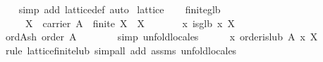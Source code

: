 \begin{isabellebody}
\ \ %
\endisadelimproof
%
\isatagproof
{}\isamarkupfalse%
\ {}simp\ add{}\ lattice{}def{}\ auto{}%
\endisatagproof
{\isafoldproof}%
%
\isadelimproof
\isanewline
%
\endisadelimproof
\isanewline
{}\isamarkupfalse%
\ lattice\isanewline
{}\isanewline
\isanewline
\ \ \isamarkupfalse%
\ finite{}glb{}\isanewline
\ \ \ \ \ {}X\ {}\ carrier\ A{}\ \ {}finite\ X{}\ \ {}X\ {}\ {}{}{}\isanewline
\ \ \ \ \ {}{}x{}\ is{}glb\ x\ X{}\isanewline
%
\isadelimproof
\ \ %
\endisadelimproof
%
\isatagproof
{}\isamarkupfalse%
\ {}\isanewline
\ \ \ \ \isamarkupfalse%
\ ord{}Ash{}\ {}order\ {}A{}{}{}\isanewline
\ \ \ \ \ \ \isamarkupfalse%
\ {}simp{}\ unfold{}locales{}\isanewline
\isanewline
\ \ \ \ \isamarkupfalse%
\ {}{}x{}\ order{}is{}lub\ {}A{}{}\ x\ X{}\isanewline
\ \ \ \ \ \ \isamarkupfalse%
\ {}rule\ lattice{}finite{}lub{}\ simp{}all\ add{}\ assms{}\ unfold{}locales{}\isanewline

\end{isabellebody}
